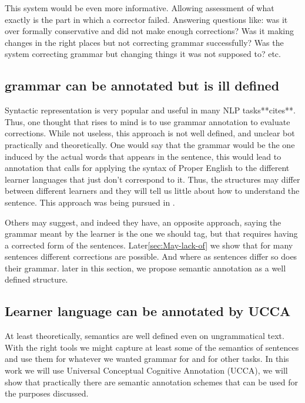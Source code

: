 \documentclass[english]{article}
\begin{document}
This system would be even more informative. Allowing assessment of
what exactly is the part in which a corrector failed. Answering questions
like: was it over formally conservative and did not make enough corrections?
Was it making changes in the right places but not correcting grammar
successfully? Was the system correcting grammar but changing things
it was not supposed to? etc.

\subsection{grammar can be annotated but is ill defined}

Syntactic representation is very popular and useful in many NLP tasks{*}{*}cites{*}{*}.
Thus, one thought that rises to mind is to use grammar annotation
to evaluate corrections. While not useless, this approach is not well
defined, and unclear bot practically and theoretically. One would
say that the grammar would be the one induced by the actual words
that appears in the sentence, this would lead to annotation that calls
for applying the syntax of Proper English to the different learner
languages that just don't correspond to it. Thus, the structures may
differ between different learners and they will tell us little about
how to understand the sentence. This approach was being pursued in
\cite{berzak2016universal}. 

Others may suggest, and indeed they have\cite{nagataphrase}, an opposite
approach, saying the grammar meant by the learner is the one we should
tag, but that requires having a corrected form of the sentences. Later\ref{sec:May-lack-of}
we show that for many sentences different corrections are possible.
And where as sentences differ so does their grammar. later in this
section, we propose semantic annotation as a well defined structure.

\subsection{Learner language can be annotated by UCCA}

At least theoretically, semantics are well defined even on ungrammatical
text. With the right tools we might capture at least some of the semantics
of sentences and use them for whatever we wanted grammar for and for
other tasks. In this work we will use Universal Conceptual Cognitive
Annotation (UCCA)\cite{abend2013universal}, we will show that practically
there are semantic annotation schemes that can be used for the purposes
discussed.
\end{document}
